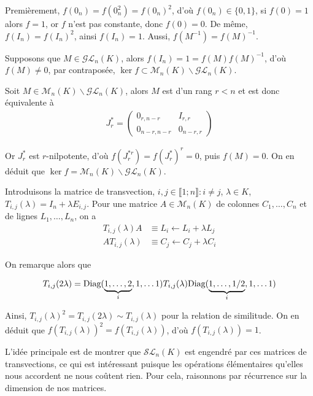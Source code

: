 \documentclass{article}
\begin{document}
Premièrement, $f(0_n)=f(0_n^2)=f(0_n)^2$, d'où $f(0_n) \in \{0,1\}$, si $f(0)=1$ alors $f = 1$, or $f$ n'est pas constante, donc $f(0) = 0$. De même, $f(I_n) = f(I_n)^2$, ainsi $f(I_n) = 1$. Aussi, $f(M^{-1}) = f(M)^{-1}$.

Supposons que $M\in\mathcal{G}\mathcal{L}_n(K)$, alors $f(I_n) = 1 = f(M)f(M)^{-1}$, d'où $f(M)\neq 0$, par contraposée, $\ker f\subset \mathcal{M}_n(K)\backslash\mathcal{G}\mathcal{L}_n(K)$.

Soit $M\in\mathcal{M}_n(K)\backslash\mathcal{G}\mathcal{L}_n(K)$, alors $M$ est d'un rang $r<n$ et est donc équivalente à 
\begin{align*}
J_r^* = \begin{pmatrix}0_{r,n-r}&I_{r,r}\\
0_{n-r,n-r}&0_{n-r,r}\end{pmatrix}
\end{align*}

Or $J_r^*$ est $r$-nilpotente, d'où $f(J_r^{*r})=f(J_r^*)^r=0$, puis $f(M) = 0$. On en déduit que $\ker f = \mathcal{M}_n(K)\backslash\mathcal{G}\mathcal{L}_n(K)$.
\newline

Introduisons la matrice de transvection, $i,j\in\llbracket 1;n\rrbracket : i\neq j$, $\lambda\in K$, $T_{i,j}(\lambda) = I_n+\lambda E_{i,j}$. Pour une matrice $A\in\mathcal{M}_n(K)$ de colonnes $C_1,\ldots, C_n$ et de lignes $L_1,\ldots, L_n$, on a
\begin{align*}
T_{i,j}(\lambda) A &\equiv L_i \leftarrow L_i + \lambda L_j\\
A T_{i,j}(\lambda) &\equiv C_j \leftarrow C_j + \lambda C_i
\end{align*}

On remarque alors que

\begin{align*}
T_{i,j}(2\lambda) = \textup{Diag}(\underbrace{1,\ldots,2}_{i},1,\ldots 1) T_{i,j}(\lambda)  \textup{Diag}(\underbrace{1,\ldots,1/2}_{i},1,\ldots 1)
\end{align*}

Ainsi, $T_{i,j}(\lambda)^2 = T_{i,j}(2\lambda) \sim T_{i,j}(\lambda)$ pour la relation de similitude. On en déduit que $f(T_{i,j}(\lambda))^2 = f(T_{i,j}(\lambda))$, d'où $f(T_{i,j}(\lambda)) = 1$.

 
L'idée principale est de montrer que $\mathcal{S}\mathcal{L}_n(K)$ est engendré par ces matrices de transvections, ce qui est intéressant puisque les opérations élémentaires qu'elles nous accordent ne nous coûtent rien. Pour cela, raisonnons par récurrence sur la dimension de nos matrices.
\end{document}
